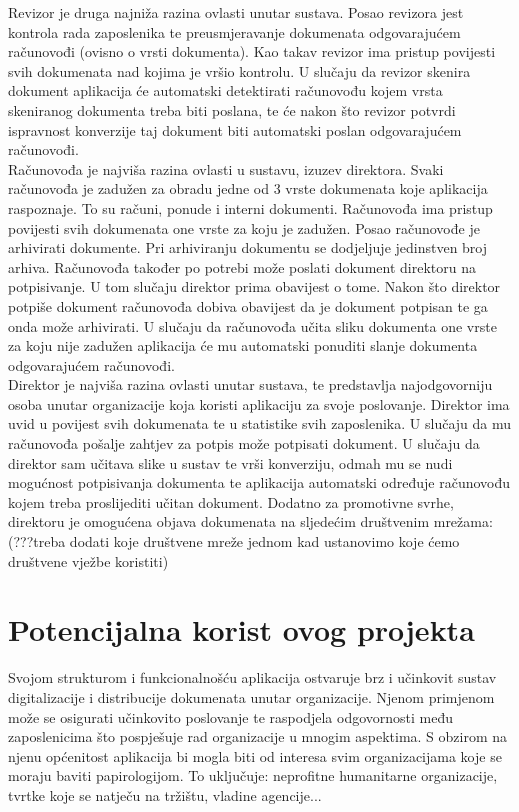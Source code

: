 	Revizor je druga najniža razina ovlasti unutar sustava. Posao revizora jest kontrola rada zaposlenika te preusmjeravanje dokumenata odgovarajućem računovođi (ovisno o vrsti dokumenta). Kao takav revizor ima pristup povijesti svih dokumenata nad kojima je vršio kontrolu. U slučaju da revizor skenira dokument aplikacija će automatski detektirati računovođu kojem vrsta skeniranog dokumenta treba biti poslana, te će nakon što revizor potvrdi ispravnost konverzije taj dokument biti automatski poslan odgovarajućem računovođi.\\
	
	
	Računovođa je najviša razina ovlasti u sustavu, izuzev direktora. Svaki računovođa je zadužen za obradu jedne od 3 vrste dokumenata koje aplikacija raspoznaje. To su računi, ponude i interni dokumenti. Računovođa ima pristup povijesti svih dokumenata one vrste za koju je zadužen. Posao računovođe je arhivirati dokumente. Pri arhiviranju dokumentu se dodjeljuje jedinstven broj arhiva. Računovođa također po potrebi može poslati dokument direktoru na potpisivanje. U tom slučaju direktor prima obavijest o tome. Nakon što direktor potpiše dokument računovođa dobiva obavijest da je dokument potpisan te ga onda može arhivirati. U slučaju da računovođa učita sliku dokumenta one vrste za koju nije zadužen aplikacija će mu automatski ponuditi slanje dokumenta odgovarajućem računovođi.\\
	
	Direktor je najviša razina ovlasti unutar sustava, te predstavlja najodgovorniju osoba unutar organizacije koja koristi aplikaciju za svoje poslovanje. Direktor ima uvid u povijest svih dokumenata te u statistike svih zaposlenika. U slučaju da mu računovođa pošalje zahtjev za potpis može potpisati dokument. U slučaju da direktor sam učitava slike u sustav te vrši konverziju, odmah mu se nudi mogućnost potpisivanja dokumenta te aplikacija automatski određuje računovođu kojem treba proslijediti učitan dokument. Dodatno za promotivne svrhe, direktoru je omogućena objava dokumenata na sljedećim društvenim mrežama: (???treba dodati koje društvene mreže jednom kad ustanovimo koje ćemo društvene vježbe koristiti) \\
	
	\section{Potencijalna korist ovog projekta}
	
	Svojom strukturom i funkcionalnošću aplikacija ostvaruje brz i učinkovit sustav digitalizacije i distribucije dokumenata unutar organizacije. Njenom primjenom može se osigurati učinkovito poslovanje te raspodjela odgovornosti među zaposlenicima što pospješuje rad organizacije u mnogim aspektima. S obzirom na njenu općenitost aplikacija bi mogla biti  od interesa svim organizacijama koje se moraju baviti papirologijom. To uključuje: neprofitne humanitarne organizacije, tvrtke koje se natječu na tržištu, vladine agencije...\\
	
